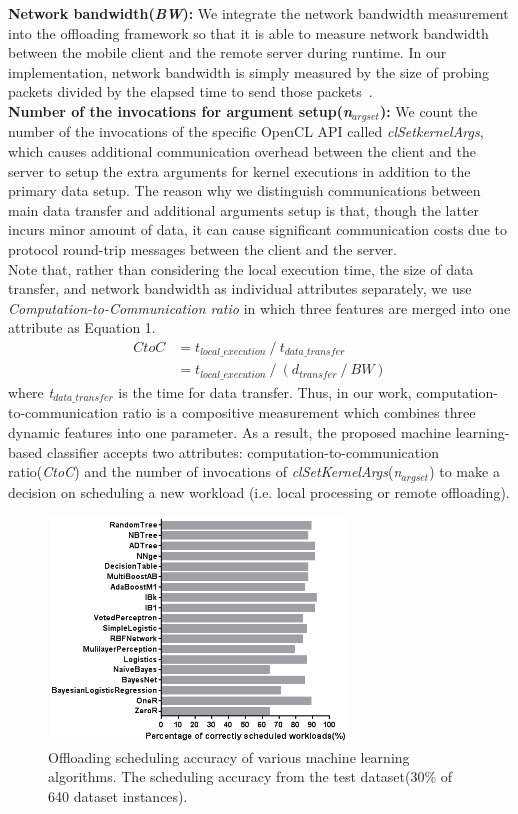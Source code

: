\documentclass[10pt, conference, compsocconf]{IEEEtran}
\begin{document}
%
\textbf{Network bandwidth(\textit{BW}):} We integrate the network
bandwidth measurement into the offloading framework so that it is able
to measure network bandwidth between the mobile client and the
remote server during runtime.
%
In our implementation, network bandwidth is simply measured by the
size of probing packets divided by the elapsed time to send those
packets~\cite{bandwidth}.\\ 
%
\textbf{Number of the invocations for argument
setup(\textit{n$_{argset}$}):} We count the number of the invocations of
the specific OpenCL API called \textit{clSetkernelArgs}, which causes
additional communication overhead between the client and the server to
setup the extra arguments for kernel executions in addition to the
primary data setup.
%
The reason why we distinguish communications between main data transfer
and additional arguments setup is that, though the latter incurs minor
amount of data, it can cause significant communication costs due to
protocol round-trip messages between the client and the server.\\
%
\indent Note that, rather than considering the local execution time, the
size of data transfer, and network bandwidth as individual attributes
separately, we use \textit{Computation-to-Communication ratio} in which
three features are merged into one attribute as Equation 1. 
%
\begin{equation}
\begin{split}
	CtoC& = t_{local\_execution}\:/\: t_{data\_transfer} \\ 
        & = t_{local\_execution}\:/\:(d_{transfer}\:/\:BW)
\end{split}
\end{equation}
%
where \textit{t$_{data\_transfer}$} is the time for data transfer.
%
Thus, in our work, computation-to-communication ratio is a compositive
measurement which combines three dynamic features into one parameter.
%
As a result, the proposed machine learning-based classifier accepts two
attributes:
computation-to-communication ratio(\textit{CtoC}) and the number of
invocations of \textit{clSetKernelArgs}(\textit{n$_{argset}$}) to make a
decision on scheduling a new workload (i.e. local processing or remote offloading).
%
\begin{figure}
\centering
\includegraphics[height=6.0cm, width=8.0cm]{Figure/figure4}
\caption{Offloading scheduling accuracy of various machine learning
algorithms.
% 
The scheduling accuracy from the test dataset(30\% of 640
dataset instances).}
\end{figure}
%
\end{document}
